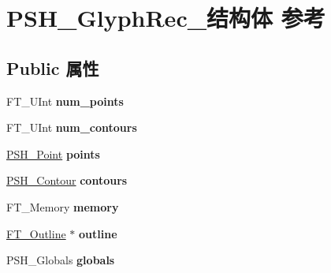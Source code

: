 \hypertarget{struct_p_s_h___glyph_rec__}{}\section{P\+S\+H\+\_\+\+Glyph\+Rec\+\_\+结构体 参考}
\label{struct_p_s_h___glyph_rec__}
\subsection*{Public 属性}
\begin{DoxyCompactItemize}
\item 
\mbox{\label{struct_p_s_h___glyph_rec___a696eb2226c5aa1c55ab162f725a7c9b7}} 
F\+T\+\_\+\+U\+Int {\bfseries num\+\_\+points}
\item 
\mbox{\label{struct_p_s_h___glyph_rec___a742cca21d75380d3b3c6589f2e69aec4}} 
F\+T\+\_\+\+U\+Int {\bfseries num\+\_\+contours}
\item 
\mbox{\label{struct_p_s_h___glyph_rec___a1e4872d9c2286dafb261a1398152674a}} 
\hyperlink{struct_p_s_h___point_rec__}{P\+S\+H\+\_\+\+Point} {\bfseries points}
\item 
\mbox{\label{struct_p_s_h___glyph_rec___ade9e594cd9ede3162787b2be47e5b719}} 
\hyperlink{struct_p_s_h___contour_rec__}{P\+S\+H\+\_\+\+Contour} {\bfseries contours}
\item 
\mbox{\label{struct_p_s_h___glyph_rec___a303af9b985cdd171dc2eb9121ba8f2a2}} 
F\+T\+\_\+\+Memory {\bfseries memory}
\item 
\mbox{\label{struct_p_s_h___glyph_rec___a8c015e611027f9066a151443f2fc3ef0}} 
\hyperlink{struct_f_t___outline__}{F\+T\+\_\+\+Outline} $\ast$ {\bfseries outline}
\item 
\mbox{\label{struct_p_s_h___glyph_rec___ae0ee8eeafcdf9c301b1b2d38b50a04e1}} 
P\+S\+H\+\_\+\+Globals {\bfseries globals}
\item 
\mbox{\label{struct_p_s_h___glyph_rec___ae46b190c2bdf88f967078b11b8c05153}} 

\end{DoxyCompactItemize}
